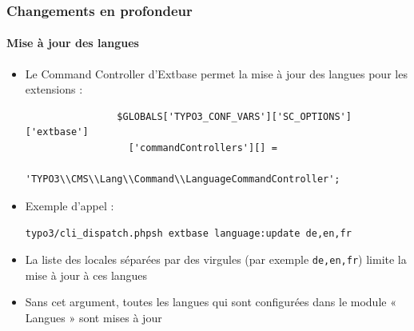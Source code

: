 
\begin{frame}[fragile]
	\frametitle{Changements en profondeur}
	\framesubtitle{Mise à jour des langues}

	\begin{itemize}
		\item Le Command Controller d'Extbase permet la mise à jour des langues pour les extensions :

			\begin{lstlisting}
				$GLOBALS['TYPO3_CONF_VARS']['SC_OPTIONS']['extbase']
				  ['commandControllers'][] =
				  'TYPO3\\CMS\\Lang\\Command\\LanguageCommandController';
			\end{lstlisting}

		\item Exemple d'appel :

			\lstinline!typo3/cli_dispatch.phpsh extbase language:update de,en,fr!

		\item La liste des locales séparées par des virgules (par exemple \texttt{de,en,fr}) limite la mise à jour à ces langues
		\item Sans cet argument, toutes les langues qui sont configurées dans le module « Langues » sont mises à jour

	\end{itemize}

\end{frame}


